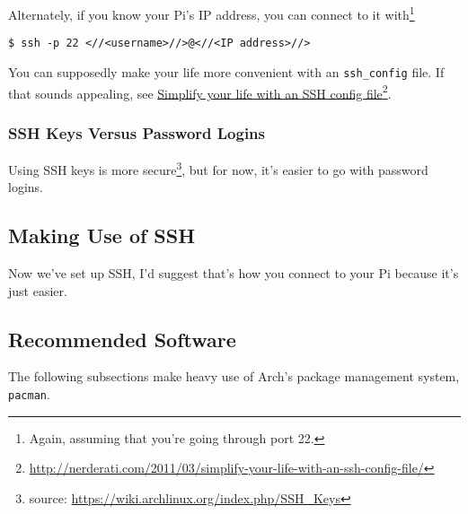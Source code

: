 \documentclass[12pt,letterpaper]{article}
\begin{document}
Alternately, if you know your Pi's IP address, you can connect to it with\footnote{Again, assuming that you're going through port 22.}
\begin{lstlisting}
$ ssh -p 22 <//<username>//>@<//<IP address>//>
\end{lstlisting}

You can supposedly make your life more convenient with an \lstinline{ssh_config} file.  If that sounds appealing, see \href{http://nerderati.com/2011/03/simplify-your-life-with-an-ssh-config-file/}{Simplify your life with an SSH config file}\footnote{\url{http://nerderati.com/2011/03/simplify-your-life-with-an-ssh-config-file/}}.

%


\subsubsection{SSH Keys Versus Password Logins}
Using SSH keys is more secure\footnote{source: \url{https://wiki.archlinux.org/index.php/SSH_Keys}}, but for now, it's easier to go with password logins.

\subsection{Making Use of SSH}

Now we've set up SSH, I'd suggest that's how you connect to your Pi because it's just easier.

\subsection{Recommended Software}

The following subsections make heavy use of Arch's package management system, \lstinline{pacman}.
\end{document}
